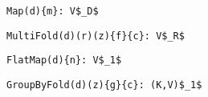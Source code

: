 \begin{figure*}
\centering

\newsavebox{\Map}
\begin{lrbox}{\Map}
\begin{lstlisting}[language=PPLTable]
Map(d){m}: V$_D$
\end{lstlisting}
\end{lrbox}

\newsavebox{\MultiFold}
\begin{lrbox}{\MultiFold}
\begin{lstlisting}[language=PPLTable]
MultiFold(d)(r)(z){f}{c}: V$_R$
\end{lstlisting}
\end{lrbox}

\newsavebox{\FlatMap}
\begin{lrbox}{\FlatMap}
\begin{lstlisting}[language=PPLTable]
FlatMap(d){n}: V$_1$
\end{lstlisting}
\end{lrbox}



\newsavebox{\GroupByFold}
\begin{lrbox}{\GroupByFold}
\begin{lstlisting}[language=PPLTable]
GroupByFold(d)(z){g}{c}: (K,V)$_1$
\end{lstlisting}
\end{lrbox}



\end{figure*}
